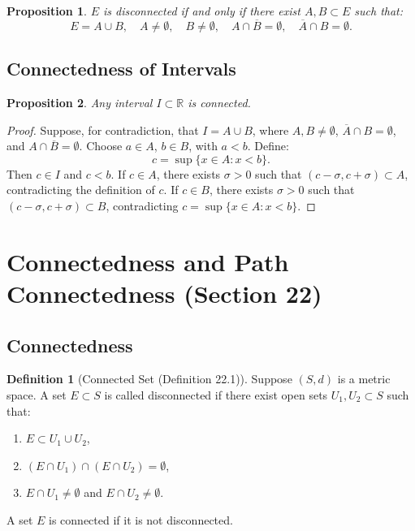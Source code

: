 \documentclass[9pt]{article}
\theoremstyle{definition}
\newtheorem{definition}{Definition}
\theoremstyle{plain}
\newtheorem{proposition}{Proposition}
\begin{document}
\begin{proposition}
\( E \) is disconnected if and only if there exist \( A, B \subset E \) such that:
\[
E = A \cup B, \quad A \neq \emptyset, \quad B \neq \emptyset, \quad A \cap \overline{B} = \emptyset, \quad \overline{A} \cap B = \emptyset.
\]
\end{proposition}

\subsection*{Connectedness of Intervals}
\begin{proposition}
Any interval \( I \subset \mathbb{R} \) is connected.
\end{proposition}

\begin{proof}
Suppose, for contradiction, that \( I = A \cup B \), where \( A, B \neq \emptyset \), \( \overline{A} \cap B = \emptyset \), and \( A \cap \overline{B} = \emptyset \). Choose \( a \in A \), \( b \in B \), with \( a < b \). Define:
\[
c = \sup \{x \in A : x < b\}.
\]
Then \( c \in I \) and \( c < b \). If \( c \in A \), there exists \( \sigma > 0 \) such that \( (c - \sigma, c + \sigma) \subset A \), contradicting the definition of \( c \). If \( c \in B \), there exists \( \sigma > 0 \) such that \( (c - \sigma, c + \sigma) \subset B \), contradicting \( c = \sup \{x \in A : x < b\} \).
\end{proof}
\section*{Connectedness and Path Connectedness (Section 22)}

\subsection*{Connectedness}
\begin{definition}[Connected Set (Definition 22.1)]
Suppose \( (S, d) \) is a metric space. A set \( E \subset S \) is called disconnected if there exist open sets \( U_1, U_2 \subset S \) such that:
\begin{enumerate}
    \item \( E \subset U_1 \cup U_2 \),
    \item \( (E \cap U_1) \cap (E \cap U_2) = \emptyset \),
    \item \( E \cap U_1 \neq \emptyset \) and \( E \cap U_2 \neq \emptyset \).
\end{enumerate}
A set \( E \) is connected if it is not disconnected.
\end{definition}
\end{document}
